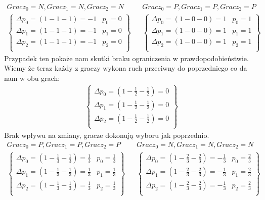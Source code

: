 \begin{align*}
Gracz_0 = N, Gracz_1 = N, Gracz_2 = N && Gracz_0 = P, Gracz_1 = P, Gracz_2 = P \\
\left\{
\begin{array}{ll}
\Delta p_0 = (1 - 1 - 1) =  -1 & p_0=0\\
\Delta p_1 = (1 - 1 - 1) =  -1 & p_1= 0\\
\Delta p_2 = (1 - 1 - 1) =  -1 & p_2=0\\
\end{array} 
\right\} &&
\left\{
\begin{array}{ll}
\Delta p_0 = (1 - 0 - 0) =  1 & p_0= 1\\
\Delta p_1 = (1 - 0 - 0) =  1 & p_1= 1\\
\Delta p_2 = (1 - 0 - 0) =  1 & p_2= 1\\
\end{array}
\right\}
\end{align*}
Przypadek ten pokaże nam skutki braku ograniczenia w prawdopodobieństwie. Wiemy że teraz każdy z graczy wykona ruch przeciwny do poprzedniego co da nam w obu grach:
\begin{align*}
\left\{
\begin{array}{l}
\Delta p_0 = (1 - \frac{1}{2} - \frac{1}{2}) =  0 \\
\Delta p_1 = (1 - \frac{1}{2} - \frac{1}{2}) =  0 \\
\Delta p_2 = (1 - \frac{1}{2} - \frac{1}{2}) =  0 \\
\end{array} 
\right\}
\end{align*}
Brak wpływu na zmiany, gracze dokonują wyboru jak poprzednio.
\begin{align*}
Gracz_0 = P, Gracz_1 = P, Gracz_2 = P && Gracz_0 = N, Gracz_1 = N, Gracz_2 = N \\
\left\{
\begin{array}{ll}
\Delta p_0 = (1 - \frac{1}{3} - \frac{1}{3}) =  \frac{1}{3} & p_0= \frac{1}{3}\\
\Delta p_1 = (1 - \frac{1}{3} - \frac{1}{3}) =  \frac{1}{3} & p_1= \frac{1}{3}\\
\Delta p_2 = (1 - \frac{1}{3} - \frac{1}{3}) =  \frac{1}{3} & p_2= \frac{1}{3}\\
\end{array} 
\right\} &&
\left\{
\begin{array}{ll}
\Delta p_0 = (1 - \frac{2}{3} - \frac{2}{3}) =  -\frac{1}{3} & p_0= \frac{2}{3}\\
\Delta p_1 = (1 - \frac{2}{3} - \frac{2}{3}) =  -\frac{1}{3} & p_1= \frac{2}{3}\\
\Delta p_2 = (1 - \frac{2}{3} - \frac{2}{3}) =  -\frac{1}{3} & p_2= \frac{2}{3}\\
\end{array}
\right\}
\end{align*}
